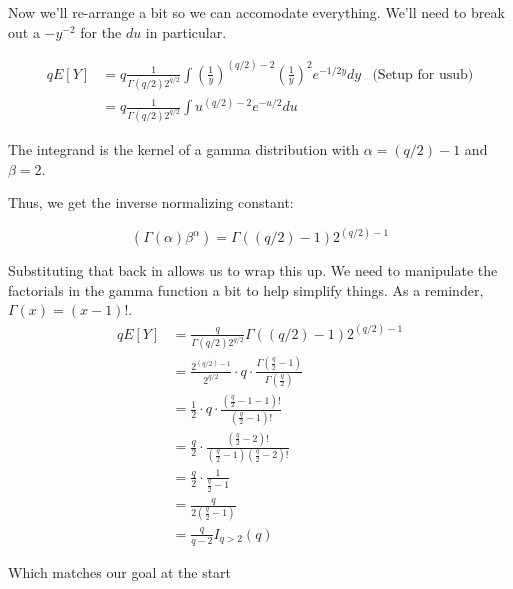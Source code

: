 Now we'll re-arrange a bit so we can accomodate everything. We'll need to break out a $-y^{-2}$ for the $du$ in particular.

\vspace{-0.4cm}
\begin{align*}
	qE[Y] &= q  \frac{1}{\Gamma(q/2)2^{q/2}} \int \left( \frac{1}{y} \right)^{(q/2)-2}  \left( \frac{1}{y} \right)^{2} e^{-1/2y} dy & \text{(Setup for usub)} \\
	&=  q  \frac{1}{\Gamma(q/2)2^{q/2}} \int u^{(q/2) - 2} e^{-u/2} du 
\end{align*}

The integrand is the kernel of a gamma distribution with $\alpha=(q/2) -1$ and $\beta=2$. 

Thus, we get the inverse normalizing constant:

$$ (\Gamma(\alpha) \beta^{\alpha}) = \Gamma( (q/2)-1 ) 2^{(q/2)-1} $$

Substituting that back in allows us to wrap this up. We need to manipulate the factorials in the gamma function a bit to help simplify things. As a reminder, $\Gamma(x) = (x-1)!$.
\vspace{-0.4cm}
\begin{align*}
	qE[Y] &=  \frac{q}{\Gamma(q/2)2^{q/2}} \Gamma( (q/2)-1 ) 2^{(q/2)-1} \\
	&= \frac{ 2^{(q/2)-1} }{ 2^{q/2} } \cdot q \cdot \frac{\Gamma\left( \frac{q}{2} - 1 \right)}{\Gamma\left( \frac{q}{2} \right)} \\
	&= \frac{1}{2} \cdot q \cdot \frac{\left( \frac{q}{2} - 1 - 1 \right)!}{\left( \frac{q}{2} - 1 \right)!} \\
	&= \frac{q}{2} \cdot \frac{\left( \frac{q}{2} - 2 \right)!}{\left( \frac{q}{2} - 1 \right) \left( \frac{q}{2} - 2 \right)!} \\
	&= \frac{q}{2} \cdot \frac{1}{\frac{q}{2} - 1} \\
	&= \frac{q}{2\left( \frac{q}{2} - 1 \right)} \\
	&= \frac{q}{q - 2} I_{q > 2}(q)
\end{align*}


Which matches our goal at the start
